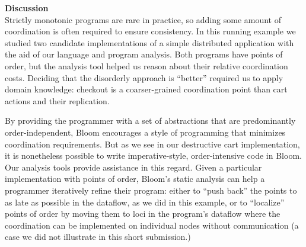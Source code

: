 
\noindent
\textbf{Discussion}\\
\noindent
Strictly monotonic programs
are rare in practice, so adding some amount of coordination is often required to
ensure consistency. In this running example we studied
two candidate implementations of a simple distributed application with the aid of
our language and program analysis. Both programs have points of order, but the analysis tool helped us reason about their relative coordination costs.  Deciding that the disorderly
approach is ``better'' required us to apply domain knowledge: checkout is a coarser-grained coordination point than cart actions and their replication.

By providing the programmer with a set of abstractions that are predominantly
order-independent, Bloom encourages a style of programming that minimizes
coordination requirements. But as we see in our destructive cart implementation,
it is nonetheless possible to write imperative-style, order-intensive code in
Bloom.  Our analysis tools provide assistance in this regard.  Given a
particular implementation with points of order, Bloom's static analysis can help
a programmer iteratively refine their program: either to ``push back'' the
points to as late as possible in the dataflow, as we did in this example, or to
``localize'' points of order by moving them to loci in the program's dataflow
where the coordination can be implemented on individual nodes without
communication (a case we did not illustrate in this short submission.)
